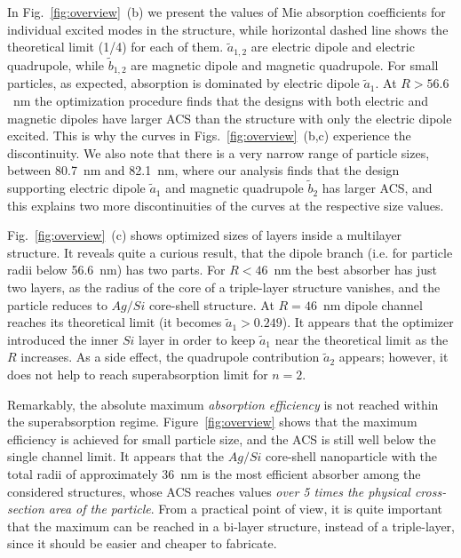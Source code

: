 \documentclass[aps,prl,twocolumn,showpacs,superscriptaddress,groupedaddress]{revtex4-1}
\begin{document}
In Fig.~\ref{fig:overview}~(b) we present the values of Mie absorption
coefficients for individual excited modes in the structure, while
horizontal dashed line shows the theoretical limit (1/4) for each of
them. $\tilde{a}_{1,2}$ are electric dipole and electric quadrupole,
while $\tilde{b}_{1,2}$ are magnetic dipole and magnetic
quadrupole. For small particles, as expected, absorption is dominated
by electric dipole $\tilde{a}_1$.  At $R > 56.6$~nm the optimization
procedure finds that the designs with both electric and magnetic
dipoles have larger ACS than the structure with only the electric
dipole excited. This is why the curves in
Figs.~\ref{fig:overview}~(b,c) experience the discontinuity. We also
note that there is a very narrow range of particle sizes, between
80.7~nm and 82.1~nm, where our analysis finds that the design
supporting electric dipole $\tilde{a}_1$ and magnetic quadrupole
$\tilde{b}_2$ has larger ACS, and this explains two more
discontinuities of the curves at the respective size values.

Fig.~\ref{fig:overview}~(c) shows optimized sizes of layers inside a
multilayer structure. It reveals quite a curious result, that the
dipole branch (i.e. for particle radii below 56.6~nm) has two
parts. For $R<46$~nm the best absorber has just two layers, as the
radius of the core of a triple-layer structure vanishes, and the
particle reduces to $Ag/Si$ core-shell structure.  At $R=46$~nm dipole
channel reaches its theoretical limit (it becomes
$\tilde{a}_1>0.249$).  It appears that the optimizer introduced the
inner $Si$ layer in order to keep $\tilde{a}_1$ near the theoretical
limit as the $R$ increases.  As a side effect, the quadrupole
contribution $\tilde{a}_2$ appears; however, it does not help to reach
superabsorption limit for $n=2$.

Remarkably, the absolute maximum {\em absorption efficiency} is not
reached within the superabsorption regime. Figure~\ref{fig:overview}
shows that the maximum efficiency is achieved for small particle size,
and the ACS is still well below the single channel limit. It appears
that the $Ag/Si$ core-shell nanoparticle with the total radii of
approximately 36~nm is the most efficient absorber among the considered
structures, whose ACS reaches values {\em over 5 times the physical
  cross-section area of the particle}.  From a practical point of view,
it is quite important that the maximum can be reached in a bi-layer
structure, instead of a triple-layer, since it should be easier and
cheaper to fabricate.
\end{document}
